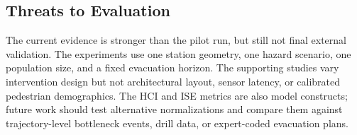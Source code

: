 \subsection{Threats to Evaluation}
\label{subsec:evaluation-threats}

The current evidence is stronger than the pilot run, but still not final
external validation. The experiments use one station geometry, one hazard
scenario, one population size, and a fixed evacuation horizon. The supporting
studies vary intervention design but not architectural layout, sensor latency,
or calibrated pedestrian demographics. The HCI and ISE metrics are also model
constructs; future work should test alternative normalizations and compare
them against trajectory-level bottleneck events, drill data, or expert-coded
evacuation plans.
